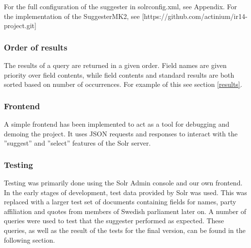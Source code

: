 For the full configuration of the suggester in solrconfig.xml, see Appendix.
For the implementation of the SuggesterMK2, see [https://github.com/actinium/ir14-project.git]

\subsubsection{Order of results}

The results of a query are returned in a given order. Field names are given priority over field contents, while field contents and standard results are both sorted based on number of occurrences. For example of this see section \ref{results}.

\subsubsection{Frontend}

A simple frontend has been implemented to act as a tool for debugging and demoing the project. It uses JSON requests and responses to interact with the ''suggest'' and ''select'' features of the Solr server.

\subsubsection{Testing}

Testing was primarily done using the Solr Admin console and our own frontend.
In the early stages of development, test data provided by Solr was used. This was replaced with a larger test set of documents containing fields for names, party affiliation and quotes from members of Swedish parliament later on. A number of queries were used to test that the suggester performed as expected. These queries, as well as the result of the tests for the final version, can be found in the following section. 
